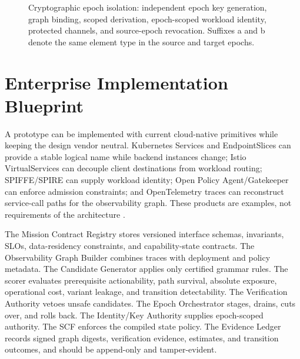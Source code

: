 \documentclass[11pt,letterpaper]{article}
\begin{document}
\begin{figure}[t]
\caption{Cryptographic epoch isolation: independent epoch key generation, graph binding, scoped derivation, epoch-scoped workload identity, protected channels, and source-epoch revocation. Suffixes a and b denote the same element type in the source and target epochs.}
\label{fig:crypto}
\end{figure}

\section{Enterprise Implementation Blueprint}

A prototype can be implemented with current cloud-native primitives while keeping the design vendor neutral. Kubernetes Services and EndpointSlices can provide a stable logical name while backend instances change; Istio VirtualServices can decouple client destinations from workload routing; SPIFFE/SPIRE can supply workload identity; Open Policy Agent/Gatekeeper can enforce admission constraints; and OpenTelemetry traces can reconstruct service-call paths for the observability graph. These products are examples, not requirements of the architecture \cite{k8sservice,istio,opa,otel}.

The Mission Contract Registry stores versioned interface schemas, invariants, SLOs, data-residency constraints, and capability-state contracts. The Observability Graph Builder combines traces with deployment and policy metadata. The Candidate Generator applies only certified grammar rules. The scorer evaluates prerequisite actionability, path survival, absolute exposure, operational cost, variant leakage, and transition detectability. The Verification Authority vetoes unsafe candidates. The Epoch Orchestrator stages, drains, cuts over, and rolls back. The Identity/Key Authority supplies epoch-scoped authority. The SCF enforces the compiled state policy. The Evidence Ledger records signed graph digests, verification evidence, estimates, and transition outcomes, and should be append-only and tamper-evident.
\end{document}
